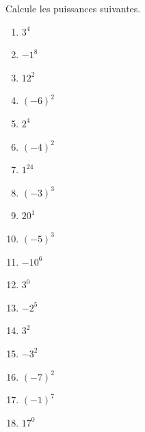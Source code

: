 %
%
	Calcule les puissances suivantes.
			\begin{enumerate}[cols=6]
				\item $3^4$
				\item $-1^8$
				\item $12^2$
				\item $(-6)^2$
				\item $2^4$
				\item $(-4)^2$
				\item $1^{24}$
				\item $(-3)^3$
				\item $20^1$
				\item $(-5)^3$
				\item $-10^6$
				\item $3^0$
				\item $-2^5$
				\item $3^2$
				\item $-3^2$
				\item $(-7)^2$
				\item $(-1)^7$
				\item $17^0$
			\end{enumerate}
